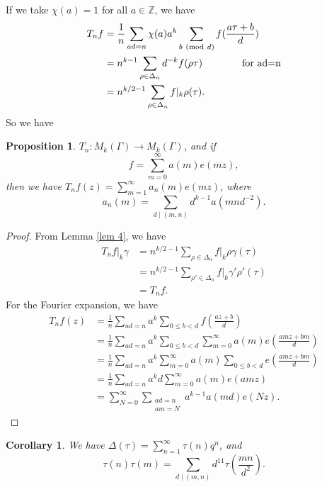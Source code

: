 \documentclass{article}
\newtheorem{corollary}[theorem]{Corollary}
\newtheorem{proposition}[theorem]{Proposition}
\newcommand{\Mod}[1]{\ (\mathrm{mod}\ #1)}
\begin{document}
If we take $\chi(a)=1$ for all $a\in \mathbb{Z}$, we have 
\begin{equation*}
    \begin{aligned}
        T_nf&=\frac{1}{n}\sum_{ad=n}\chi(a)a^k\sum_{b\Mod{d}}f(\frac{a\tau+b}{d})\\
        &=n^{k-1}\sum_{\rho \in \Delta_n}d^{-k}f(\rho \tau)\text{\qquad \qquad for ad=n}\\
        &=n^{k/2-1}\sum_{\rho \in \Delta_n}f|_k\rho (\tau).
    \end{aligned}
\end{equation*}
So we have 
\begin{proposition}
    $T_n:M_k(\Gamma)\to M_k(\Gamma)$, and if \[f=\sum_{m=0}^{\infty}a(m)e(mz),\] then we have $T_nf(z)=\sum_{m=1}^{\infty}a_n(m)e(mz)$, where\[a_n(m)=\sum_{d\mid (m,n)}d^{k-1}a(mnd^{-2}).\]
\end{proposition}
\begin{proof}
    From Lemma \ref{lem 4}, we have 
    \begin{equation*}
        \begin{aligned}
            T_nf|_k\gamma&=n^{k/2-1}\sum_{\rho\in \Delta_n}f|_k\rho\gamma(\tau)\\
            &=n^{k/2-1}\sum_{\rho'\in \Delta_n}f|_k\gamma'\rho'(\tau)\\
            &=T_nf.
        \end{aligned}
    \end{equation*}
    For the Fourier expansion, we have 
    \begin{equation*}
        \begin{aligned}
            T_nf(z)&=\frac{1}{n}\sum_{ad=n}a^k\sum_{0\leq b <d}f(\frac{az+b}{d})\\
            &=\frac{1}{n}\sum_{ad=n}a^k\sum_{0\leq b <d}\sum_{m=0}^{\infty}a(m)e(\frac{amz+bm}{d})\\
            &=\frac{1}{n}\sum_{ad=n}a^k\sum_{m=0}^{\infty}a(m)\sum_{0\leq b <d}e(\frac{amz+bm}{d})\\
            &=\frac{1}{n}\sum_{ad=n}a^kd\sum_{m=0}^{\infty}a(m)e(amz)\\
            &=\sum_{N=0}^{\infty}\sum_{\substack{ad=n\\am=N}}a^{k-1}a(md)e(Nz).
        \end{aligned}
    \end{equation*}
\end{proof}
\begin{corollary}
    We have $\Delta(\tau)=\sum_{n=1}^{\infty}\tau(n)q^n$, and \[\tau(n)\tau(m)=\sum_{d\mid (m,n)}d^{11}\tau(\frac{mn}{d^2}).\]
\end{corollary}
\end{document}

